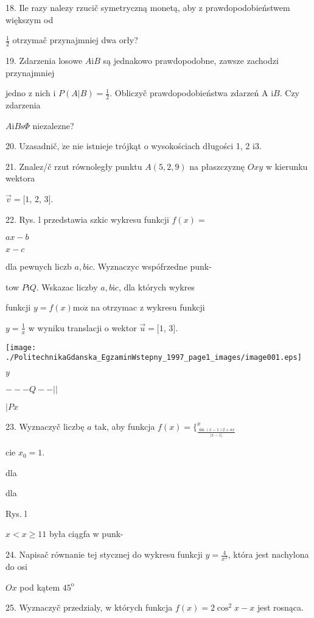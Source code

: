 \documentclass[a4paper,12pt]{article}
\begin{document}
18. Ile razy nalezy rzucič symetryczną monetą, aby z prawdopodobieństwem większym od

$\displaystyle \frac{1}{2}$ otrzymač przynajmniej dwa orły?

19. Zdarzenia losowe $A\mathrm{i}B$ są jednakowo prawdopodobne, zawsze zachodzi przynajmniej

jedno z nich i $P(A|B)=\displaystyle \frac{1}{2}$. Obliczyč prawdopodobieństwa zdarzeń A $\mathrm{i}B$. Czy zdarzenia

$ A\mathrm{i}B\mathrm{s}\Phi$ niezalezne?

20. Uzasadnič, $\dot{\mathrm{z}}\mathrm{e}$ nie istnieje trójkąt o wysokościach długości 1, 2 $\mathrm{i}3.$

21. Znalez/č rzut równoległy punktu $A(5,2,9)$ na płaszczyznę $Oxy$ w kierunku wektora

$\vec{v}=[1$, 2, 3$].$

22. Rys. l przedstawia szkic wykresu funkcji $f(x)=$

$ax-b$

$x-c$

dla pewnych liczb $a, b\mathrm{i}c$. Wyznaczyc wspófrzedne punk-

tow $P\mathrm{i}Q$. Wskazac liczby $a, b\mathrm{i}c$, dla których wykres

funkcji $y = f(x) \mathrm{m}\mathrm{o}\dot{\mathrm{z}}$ na otrzymac z wykresu funkcji

$y=\displaystyle \frac{1}{x}$ w wyniku translacji o wektor $\vec{u}=[1$, 3$].$
\begin{center}
\texttt{[image: ./PolitechnikaGdanska\_EgzaminWstepny\_1997\_page1\_images/image001.eps]}
\end{center}
$y$

$---Q--||$

$|P x$

23. Wyznaczyč liczbę $a$ tak, aby funkcja $f(x)=\{_{\frac{\sin(x-1)2+ax}{|x-1|}}^{x}$

cie $x_{0}=1.$

dla

dla

Rys. l

$x<x\geq 11$ była ciągfa w punk-

24. Napisač równanie tej stycznej do wykresu funkcji $y=\displaystyle \frac{4}{x^{2}}$, która jest nachylona do osi

$Ox$ pod kątem $45^{\mathrm{o}}$

25. Wyznaczyč przedzialy, w których funkcja $f(x)=2\cos^{2}x-x$ jest rosnąca.
\end{document}
